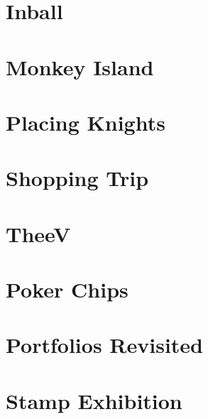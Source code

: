 \documentclass[a4paper, 10pt]{article}
\let\stdsection\section
\renewcommand\section{\newpage\stdsection}
\newcommand{\includecode}[1]{
    }
\newcommand{\algoAuthor}{2} %
\begin{document}
    \section{Inball}
        \label{sec:inball}
        \includecode{../problems/w08/Inball/Inball\algoAuthor.cpp}
    
    
    \section{Monkey Island}
        \label{sec:monkey_island}
        \includecode{../problems/w09/Monkey_Island/MonkeyIsland\algoAuthor.cpp}
        
    \section{Placing Knights}
        \label{sec:placing_knights}
        \includecode{../problems/w09/Placing_Knights/PlacingKnights\algoAuthor.cpp}
        
    \section{Shopping Trip}
        \label{sec:shopping_trip}
        \includecode{../problems/w09/Shopping_Trip/ShoppingTrip\algoAuthor.cpp}
        
    \section{TheeV}
        \label{sec:theev}
        \includecode{../problems/w09/TheeV/TheeV\algoAuthor.cpp}
   
    
    \section{Poker Chips}
        \label{sec:poker_chips}
        \includecode{../problems/w10/Poker_Chips/PokerChips\algoAuthor.cpp}
        
    \section{Portfolios Revisited}
        \label{sec:portfolios_revisited}
        \includecode{../problems/w10/Portfolios_Revisited/PortfolioRevisited\algoAuthor.cpp}
        
    \section{Stamp Exhibition}
        \label{sec:stamp_exhibition}
        \includecode{../problems/w10/Stamp_Exhibition/StampExhibition\algoAuthor.cpp}
        
\end{document}
